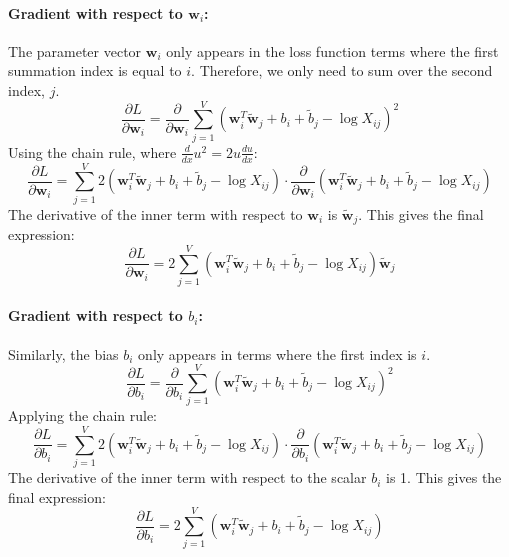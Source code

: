 \documentclass{article}
\begin{document}
\paragraph{Gradient with respect to $\mathbf{w}_i$:}
The parameter vector $\mathbf{w}_i$ only appears in the loss function terms where the first summation index is equal to $i$. Therefore, we only need to sum over the second index, $j$.
\[ \frac{\partial L}{\partial \mathbf{w}_i} = \frac{\partial}{\partial \mathbf{w}_i} \sum_{j=1}^{V} \left( \mathbf{w}_i^T \tilde{\mathbf{w}}_j + b_i + \tilde{b}_j - \log X_{ij} \right)^2 \]
Using the chain rule, where $\frac{d}{dx}u^2 = 2u \frac{du}{dx}$:
\[ \frac{\partial L}{\partial \mathbf{w}_i} = \sum_{j=1}^{V} 2 \left( \mathbf{w}_i^T \tilde{\mathbf{w}}_j + b_i + \tilde{b}_j - \log X_{ij} \right) \cdot \frac{\partial}{\partial \mathbf{w}_i} \left( \mathbf{w}_i^T \tilde{\mathbf{w}}_j + b_i + \tilde{b}_j - \log X_{ij} \right) \]
The derivative of the inner term with respect to $\mathbf{w}_i$ is $\tilde{\mathbf{w}}_j$. This gives the final expression:
\[ \frac{\partial L}{\partial \mathbf{w}_i} = 2 \sum_{j=1}^{V} \left( \mathbf{w}_i^T \tilde{\mathbf{w}}_j + b_i + \tilde{b}_j - \log X_{ij} \right) \tilde{\mathbf{w}}_j \]

\paragraph{Gradient with respect to $b_i$:}
Similarly, the bias $b_i$ only appears in terms where the first index is $i$.
\[ \frac{\partial L}{\partial b_i} = \frac{\partial}{\partial b_i} \sum_{j=1}^{V} \left( \mathbf{w}_i^T \tilde{\mathbf{w}}_j + b_i + \tilde{b}_j - \log X_{ij} \right)^2 \]
Applying the chain rule:
\[ \frac{\partial L}{\partial b_i} = \sum_{j=1}^{V} 2 \left( \mathbf{w}_i^T \tilde{\mathbf{w}}_j + b_i + \tilde{b}_j - \log X_{ij} \right) \cdot \frac{\partial}{\partial b_i} \left( \mathbf{w}_i^T \tilde{\mathbf{w}}_j + b_i + \tilde{b}_j - \log X_{ij} \right) \]
The derivative of the inner term with respect to the scalar $b_i$ is 1. This gives the final expression:
\[ \frac{\partial L}{\partial b_i} = 2 \sum_{j=1}^{V} \left( \mathbf{w}_i^T \tilde{\mathbf{w}}_j + b_i + \tilde{b}_j - \log X_{ij} \right) \]
\end{document}
